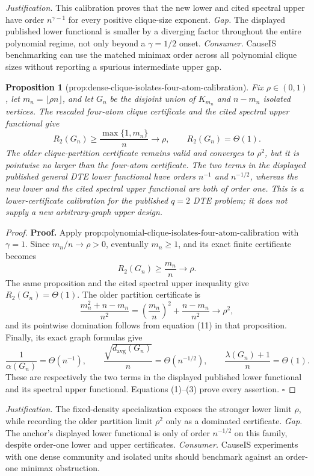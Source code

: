 \documentclass{article}
\newtheorem{proposition}{Proposition}
\begin{document}
\par\smallskip\noindent \textit{Justification.} This calibration proves that the new lower and cited spectral upper have order \(n^{\gamma-1}\) for every positive clique-size exponent. \textit{Gap.} The displayed published lower functional is smaller by a diverging factor throughout the entire polynomial regime, not only beyond a \(\gamma=1/2\) onset. \textit{Consumer.} CauseIS benchmarking can use the matched minimax order across all polynomial clique sizes without reporting a spurious intermediate upper gap.

\begin{proposition}[prop:dense-clique-isolates-four-atom-calibration]\label{prop:dense-clique-isolates-four-atom-calibration}
Fix \(\rho\in(0,1)\), let \(m_n=\lfloor\rho n\rfloor\), and let \(G_n\) be the disjoint union of \(K_{m_n}\) and \(n-m_n\) isolated vertices.  The rescaled four-atom clique certificate and the cited spectral upper functional give
\[
R_2(G_n)\geq\frac{\max\{1,m_n\}}n\longrightarrow\rho,
\qquad
R_2(G_n)=\Theta(1).
\]
The older clique-partition certificate remains valid and converges to \(\rho^2\), but it is pointwise no larger than the four-atom certificate.  The two terms in the displayed published general DTE lower functional have orders \(n^{-1}\) and \(n^{-1/2}\), whereas the new lower and the cited spectral upper functional are both of order one.  This is a lower-certificate calibration for the published \(q=2\) DTE problem; it does not supply a new arbitrary-graph upper design.
\end{proposition}
\begin{proof}
\textbf{Proof.}
Apply \(\text{prop:polynomial-clique-isolates-four-atom-calibration}\) with \(\gamma=1\).  Since \(m_n/n\to\rho>0\), eventually \(m_n\geq1\), and its exact finite certificate becomes
\[
R_2(G_n)\geq\frac{m_n}{n}\longrightarrow\rho.
\tag{1}
\]
The same proposition and the cited spectral upper inequality give \(R_2(G_n)=\Theta(1)\).  The older partition certificate is
\[
\frac{m_n^2+n-m_n}{n^2}
=\left(\frac{m_n}{n}\right)^2+\frac{n-m_n}{n^2}
\longrightarrow\rho^2,
\tag{2}
\]
and its pointwise domination follows from equation (11) in that proposition.  Finally, its exact graph formulas give
\[
\frac1{\alpha(G_n)}=\Theta(n^{-1}),
\qquad
\frac{\sqrt{d_{\mathrm{avg}}(G_n)}}n=\Theta(n^{-1/2}),
\qquad
\frac{\lambda(G_n)+1}{n}=\Theta(1).
\tag{3}
\]
These are respectively the two terms in the displayed published lower functional and its spectral upper functional.  Equations (1)--(3) prove every assertion. \(\square\)
\end{proof}
\par\smallskip\noindent \textit{Justification.} The fixed-density specialization exposes the stronger lower limit \(\rho\), while recording the older partition limit \(\rho^2\) only as a dominated certificate. \textit{Gap.} The anchor's displayed lower functional is only of order \(n^{-1/2}\) on this family, despite order-one lower and upper certificates. \textit{Consumer.} CauseIS experiments with one dense community and isolated units should benchmark against an order-one minimax obstruction.
\end{document}
